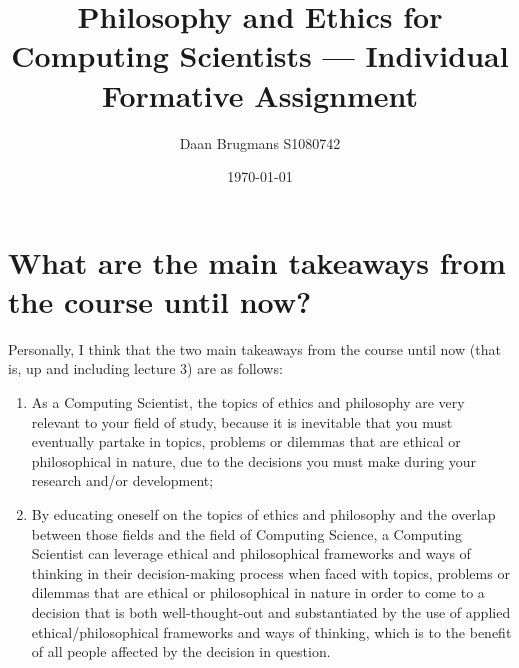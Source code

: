 \documentclass{IEEEtran}
\title{Philosophy and Ethics for Computing Scientists --- Individual Formative Assignment}
\author{Daan Brugmans S1080742}
\date{\today}
\begin{document}
\maketitle

\section*{What are the main takeaways from the course until now?}
Personally, I think that the two main takeaways from the course until now (that is, up and including lecture 3) are as follows:
\begin{enumerate}
    \item As a Computing Scientist, the topics of ethics and philosophy are very relevant to your field of study, because it is inevitable that you must eventually partake in topics, problems or dilemmas that are ethical or philosophical in nature, due to the decisions you must make during your research and/or development;
    \item By educating oneself on the topics of ethics and philosophy and the overlap between those fields and the field of Computing Science, a Computing Scientist can leverage ethical and philosophical frameworks and ways of thinking in their decision-making process when faced with topics, problems or dilemmas that are ethical or philosophical in nature in order to come to a decision that is both well-thought-out and substantiated by the use of applied ethical/philosophical frameworks and ways of thinking, which is to the benefit of all people affected by the decision in question.
\end{enumerate}
\end{document}
